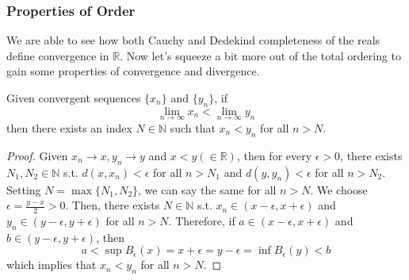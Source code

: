   \subsubsection{Properties of Order}

    We are able to see how both Cauchy and Dedekind completeness of the reals define convergence in $\mathbb{R}$. Now let's squeeze a bit more out of the total ordering to gain some properties of convergence and divergence.   

    \begin{theorem}
      Given convergent sequences $\{x_n\}$ and $\{y_n\}$, if 
      \begin{equation}
        \lim_{n \rightarrow \infty} x_n < \lim_{n \rightarrow \infty} y_n
      \end{equation}
      then there exists an index $N \in \mathbb{N}$ such that $x_n < y_n$ for all $n > N$. 
    \end{theorem}
    \begin{proof}
      Given $x_n \rightarrow x, y_n \rightarrow y$ and $x < y (\in \mathbb{R})$, then for every $\epsilon > 0$, there exists $N_1, N_2 \in \mathbb{N}$ s.t. $d(x, x_n) < \epsilon$ for all $n > N_1$ and $d(y, y_n) < \epsilon$ for all $n > N_2$. Setting $N = \max\{N_1, N_2\}$, we can say the same for all $n > N$. We choose $\epsilon = \frac{y - x}{2} > 0$. Then, there exists $N \in \mathbb{N}$ s.t. $x_n \in (x - \epsilon, x + \epsilon)$ and $y_n \in (y - \epsilon, y + \epsilon)$ for all $n > N$. Therefore, if $a \in (x - \epsilon, x + \epsilon)$ and $b \in (y - \epsilon, y + \epsilon)$, then 
      \[a < \sup B_\epsilon (x) = x + \epsilon = y - \epsilon = \inf B_\epsilon (y) < b\]
      which implies that $x_n < y_n$ for all $n > N$. 
    \end{proof}

